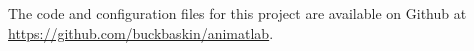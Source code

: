 The code and configuration files for this project are available on Github at \url{https://github.com/buckbaskin/animatlab}.